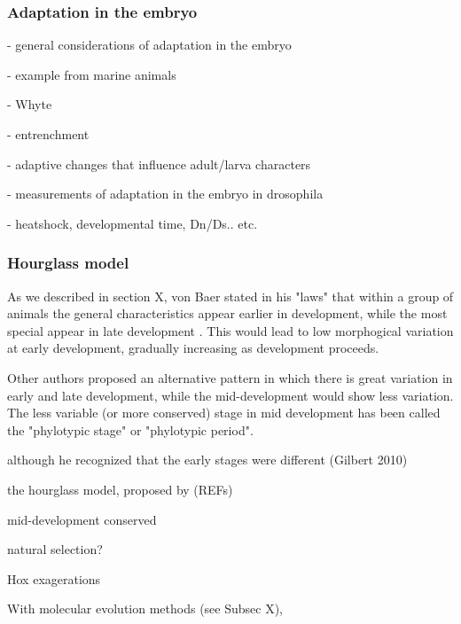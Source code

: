 

\subsubsection{Adaptation in the embryo}

- general considerations of adaptation in the embryo

- example from marine animals

- Whyte

- entrenchment

- adaptive changes that influence adult/larva characters

- measurements of adaptation in the embryo in drosophila

- heatshock, developmental time, Dn/Ds.. etc.


\subsubsection{Hourglass model}

As we described in section X, von Baer stated in his "laws" that within a group of animals the general characteristics appear earlier in development, while the most special appear in late development \citep{vonBaer1828uber}.
This would lead to low morphogical variation at early development, gradually increasing as development proceeds.

Other authors \citep{Medawar1954,Slack1993,Duboule1994,Raff1996} proposed an alternative pattern in which there is great variation in early and late development, while the mid-development would show less variation.
The less variable (or more conserved) stage in mid development has been called the "phylotypic stage" or "phylotypic period".


although he recognized that the early stages were different (Gilbert 2010)

the hourglass model, proposed by (REFs)

mid-development conserved

natural selection?

Hox exagerations

With molecular evolution methods (see Subsec X), 

